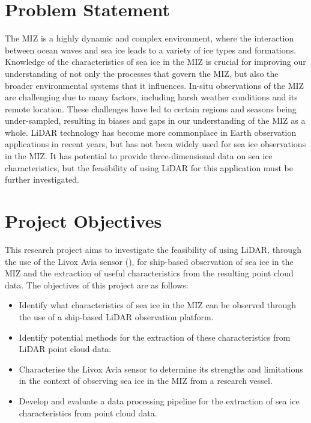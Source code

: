 \section{Problem Statement}
\label{sec:ch1.problemstatement}

The \ac{MIZ} is a highly dynamic and complex environment, where the interaction between ocean waves and sea ice leads to a variety of ice types and formations. Knowledge of the characteristics of sea ice in the \ac{MIZ} is crucial for improving our understanding of not only the processes that govern the \ac{MIZ}, but also the broader environmental systems that it influences. In-situ observations of the \ac{MIZ} are challenging due to many factors, including harsh weather conditions and its remote location. These challenges have led to certain regions and seasons being under-sampled, resulting in biases and gaps in our understanding of the \ac{MIZ} as a whole. \ac{LiDAR} technology has become more commonplace in Earth observation applications in recent years, but has not been widely used for sea ice observations in the \ac{MIZ}. It has potential to provide three-dimensional data on sea ice characteristics, but the feasibility of using \ac{LiDAR} for this application must be further investigated. 

\section{Project Objectives}
\label{sec:ch1.projectobjectives}

This research project aims to investigate the feasibility of using \ac{LiDAR}, through the use of the Livox Avia sensor (\cite{AviaLiDARSensor}), for ship-based observation of sea ice in the \ac{MIZ} and the extraction of useful characteristics from the resulting point cloud data. The objectives of this project are as follows:
\begin{itemize}
    \item Identify what characteristics of sea ice in the \ac{MIZ} can be observed through the use of a ship-based \ac{LiDAR} observation platform.
    \item Identify potential methods for the extraction of these characteristics from \ac{LiDAR} point cloud data.
    \item Characterise the Livox Avia sensor to determine its strengths and limitations in the context of observing sea ice in the \ac{MIZ} from a research vessel.
    \item Develop and evaluate a data processing pipeline for the extraction of sea ice characteristics from point cloud data.
\end{itemize}

